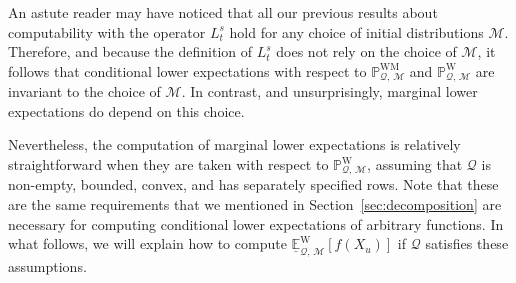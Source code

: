 \documentclass[10pt,a4paper]{paper}
\theoremstyle{definition}
\newcommand{\processes}{\mathbb{P}}
\newcommand{\wprocesses}{\processes^{\mathrm{W}}}
\newcommand{\wmprocesses}{\processes^{\mathrm{WM}}}
\newcommand{\rateset}{\mathcal{Q}}
\begin{document}
An astute reader may have noticed that all our previous results about computability with the operator $L_t^s$ hold for any choice of initial distributions $\mathcal{M}$. Therefore, and because the definition of $L_t^s$ does not rely on the choice of $\mathcal{M}$, it follows that conditional lower expectations with respect to $\wmprocesses_{\rateset,\,\mathcal{M}}$ and $\wprocesses_{\rateset,\,\mathcal{M}}$ are invariant to the choice of $\mathcal{M}$. In contrast, and unsurprisingly, marginal lower expectations do depend on this choice.


Nevertheless, the computation of marginal lower expectations is relatively straightforward when they are taken with respect to $\wprocesses_{\rateset,\,\mathcal{M}}$, assuming that $\rateset$ is non-empty, bounded, convex, and has separately specified rows. Note that these are the same requirements that we mentioned in Section~\ref{sec:decomposition} are necessary for computing conditional lower expectations of arbitrary functions. In what follows, we will explain how to compute $\underline{\mathbb{E}}_{\rateset,\,\mathcal{M}}^\mathrm{W}[f(X_u)]$ if $\rateset$ satisfies these assumptions.
\end{document}
